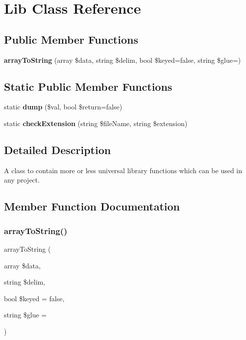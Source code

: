 \section{Lib Class Reference}
\label{class_lib}
\subsection*{Public Member Functions}
\begin{DoxyCompactItemize}
\item 
\textbf{ array\+To\+String} (array \$data, string \$delim, bool \$keyed=false, string \$glue=\textquotesingle{}\textquotesingle{})
\end{DoxyCompactItemize}
\subsection*{Static Public Member Functions}
\begin{DoxyCompactItemize}
\item 
static \textbf{ dump} (\$val, bool \$return=false)
\item 
static \textbf{ check\+Extension} (string \$file\+Name, string \$extension)
\end{DoxyCompactItemize}


\subsection{Detailed Description}
A class to contain more or less universal library functions which can be used in any project. 

\subsection{Member Function Documentation}
\mbox{\label{class_lib_a792f12586807e89f69e34b7392d6417d}} 
\subsubsection{array\+To\+String()}
{\footnotesize\ttfamily array\+To\+String (\begin{DoxyParamCaption}\item[{array}]{\$data,  }\item[{string}]{\$delim,  }\item[{bool}]{\$keyed = {\ttfamily false},  }\item[{string}]{\$glue = {\ttfamily \textquotesingle{}\textquotesingle{}} }\end{DoxyParamCaption})}

